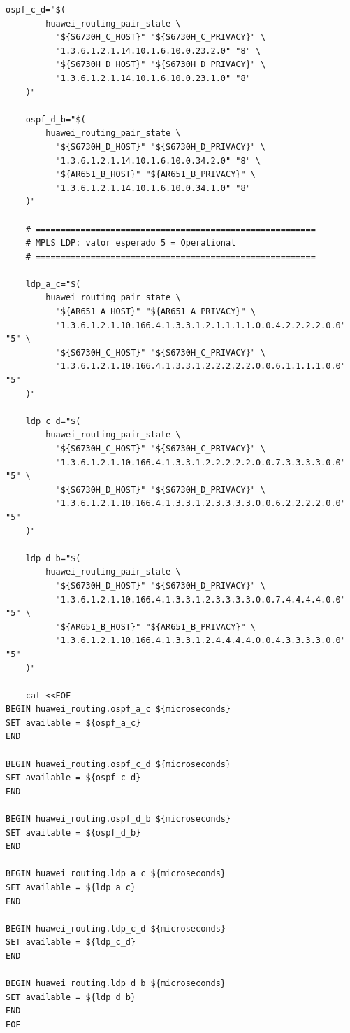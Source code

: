 \begin{itemize}
\begin{lstlisting}[style=terminal]
    ospf_c_d="$(
        huawei_routing_pair_state \
          "${S6730H_C_HOST}" "${S6730H_C_PRIVACY}" \
          "1.3.6.1.2.1.14.10.1.6.10.0.23.2.0" "8" \
          "${S6730H_D_HOST}" "${S6730H_D_PRIVACY}" \
          "1.3.6.1.2.1.14.10.1.6.10.0.23.1.0" "8"
    )"

    ospf_d_b="$(
        huawei_routing_pair_state \
          "${S6730H_D_HOST}" "${S6730H_D_PRIVACY}" \
          "1.3.6.1.2.1.14.10.1.6.10.0.34.2.0" "8" \
          "${AR651_B_HOST}" "${AR651_B_PRIVACY}" \
          "1.3.6.1.2.1.14.10.1.6.10.0.34.1.0" "8"
    )"

    # ========================================================
    # MPLS LDP: valor esperado 5 = Operational
    # ========================================================

    ldp_a_c="$(
        huawei_routing_pair_state \
          "${AR651_A_HOST}" "${AR651_A_PRIVACY}" \
          "1.3.6.1.2.1.10.166.4.1.3.3.1.2.1.1.1.1.0.0.4.2.2.2.2.0.0" "5" \
          "${S6730H_C_HOST}" "${S6730H_C_PRIVACY}" \
          "1.3.6.1.2.1.10.166.4.1.3.3.1.2.2.2.2.2.0.0.6.1.1.1.1.0.0" "5"
    )"

    ldp_c_d="$(
        huawei_routing_pair_state \
          "${S6730H_C_HOST}" "${S6730H_C_PRIVACY}" \
          "1.3.6.1.2.1.10.166.4.1.3.3.1.2.2.2.2.2.0.0.7.3.3.3.3.0.0" "5" \
          "${S6730H_D_HOST}" "${S6730H_D_PRIVACY}" \
          "1.3.6.1.2.1.10.166.4.1.3.3.1.2.3.3.3.3.0.0.6.2.2.2.2.0.0" "5"
    )"

    ldp_d_b="$(
        huawei_routing_pair_state \
          "${S6730H_D_HOST}" "${S6730H_D_PRIVACY}" \
          "1.3.6.1.2.1.10.166.4.1.3.3.1.2.3.3.3.3.0.0.7.4.4.4.4.0.0" "5" \
          "${AR651_B_HOST}" "${AR651_B_PRIVACY}" \
          "1.3.6.1.2.1.10.166.4.1.3.3.1.2.4.4.4.4.0.0.4.3.3.3.3.0.0" "5"
    )"

    cat <<EOF
BEGIN huawei_routing.ospf_a_c ${microseconds}
SET available = ${ospf_a_c}
END

BEGIN huawei_routing.ospf_c_d ${microseconds}
SET available = ${ospf_c_d}
END

BEGIN huawei_routing.ospf_d_b ${microseconds}
SET available = ${ospf_d_b}
END

BEGIN huawei_routing.ldp_a_c ${microseconds}
SET available = ${ldp_a_c}
END

BEGIN huawei_routing.ldp_c_d ${microseconds}
SET available = ${ldp_c_d}
END

BEGIN huawei_routing.ldp_d_b ${microseconds}
SET available = ${ldp_d_b}
END
EOF


\end{lstlisting}
\end{itemize}
